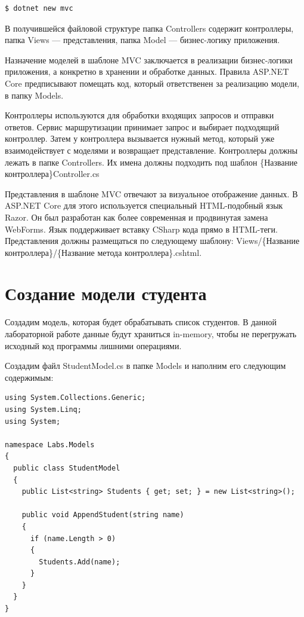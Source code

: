 \documentclass[a4paper,14pt]{extreport}
\begin{document}
\lstset{language=bash}
\begin{lstlisting}[basicstyle=\small]
$ dotnet new mvc
\end{lstlisting}

В получившейся файловой структуре папка Controllers содержит контроллеры, папка Views --- представления, папка Model --- бизнес-логику приложения.

Назначение моделей в шаблоне MVC заключается в реализации бизнес-логики приложения, а конкретно в хранении и обработке данных. Правила ASP.NET Core предписывают помещать код, который ответственен за реализацию модели, в папку Models.

Контроллеры используются для обработки входящих запросов и отправки ответов. Сервис маршрутизации принимает запрос и выбирает подходящий контроллер. Затем у контроллера вызывается нужный метод, который уже взаимодействует с моделями и возвращает представление. Контроллеры должны лежать в папке Controllers. Их имена должны подходить под шаблон \{Название контроллера\}Controller.cs

Представления в шаблоне MVC отвечают за визуальное отображение данных. В ASP.NET Core для этого используется специальный HTML-подобный язык Razor. Он был разработан как более современная и продвинутая замена WebForms. Язык поддерживает вставку CSharp кода прямо в HTML-теги. Представления должны размещаться по следующему шаблону: Views/\{Название контроллера\}/\{Название метода контроллера\}.cshtml.

\section{Создание модели студента}
Создадим модель, которая будет обрабатывать список студентов. В данной лабораторной работе данные будут храниться in-memory, чтобы не перегружать исходный код программы лишними операциями.

Создадим файл StudentModel.cs в папке Models и наполним его следующим содержимым:
\lstset{language=java}
\begin{lstlisting}[basicstyle=\small]
using System.Collections.Generic;
using System.Linq;
using System;

namespace Labs.Models
{
  public class StudentModel
  {
    public List<string> Students { get; set; } = new List<string>();

    public void AppendStudent(string name)
    {
      if (name.Length > 0)
      {
        Students.Add(name);
      }
    }
  }
}
\end{lstlisting}
\end{document}
